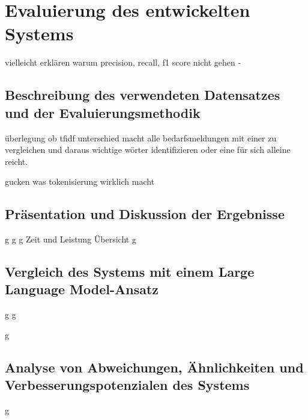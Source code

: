\chapter{Evaluierung des entwickelten Systems}
\label{chap:evaluierung}

vielleicht erklären warum precision, recall, f1 score nicht gehen -

\section{Beschreibung des verwendeten Datensatzes und der Evaluierungsmethodik}
\newpage

überlegung ob tfidf unterschied macht alle bedarfsmeldungen mit einer zu vergleichen und daraus wichtige wörter identifizieren oder eine für sich alleine reicht.

gucken was tokenisierung wirklich macht
\section{Präsentation und Diskussion der Ergebnisse}
\newpage
g
\newpage
g
\newpage
g
\newpage
Zeit und Leistung Übersicht
\newpage
g
\newpage

\section{Vergleich des Systems mit einem Large Language Model-Ansatz}
\newpage
g
\newpage
g
\newpage

g
\newpage

\section{Analyse von Abweichungen, Ähnlichkeiten und Verbesserungspotenzialen des Systems}
\newpage
g
\newpage
